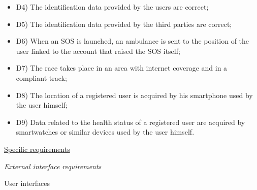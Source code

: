 \documentclass{article}
\begin{document}
\begin{legal}
\begin{legal}
\begin{legal}
{\begin{itemize}
				\item D4) The identification data provided by the users are correct;\\
				\item D5) The identification data provided by the third parties are correct;\\
				\item D6) When an SOS is launched, an ambulance is sent to the position of the user linked to the account that raised the SOS itself;\\
				\item D7) The race takes place in an area with internet coverage and in a compliant track;\\
				\item D8) The location of a registered user is acquired by his smartphone used by the user himself;\\
				\item D9) Data related to the health status of a registered user are acquired by smartwatches or similar devices used by the user himself.\\
				\end{itemize}
			}
			\end{legal}
		\end{legal}
	
\newpage
	\item \underline{Specific requirements}
  		\begin{legal}
		\item \textit{External interface requirements}
			\begin{legal}
    		\item User interfaces \\\\
			\normalfont{
			In this section follow the main mockups that represent a basic idea of what the mobile app will look like in the first release:%

}
\end{legal}
\end{legal}
\end{legal}
\end{document}
